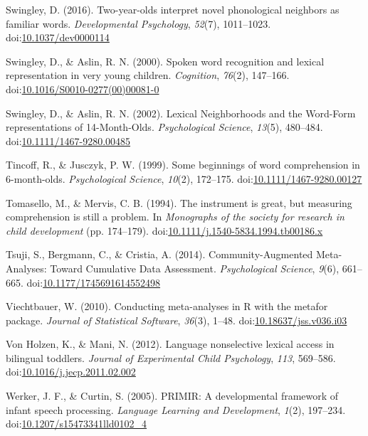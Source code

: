 \documentclass[man]{apa6}
\theoremstyle{definition}
\theoremstyle{definition}
\theoremstyle{definition}
\theoremstyle{remark}
\begin{document}
\hypertarget{ref-Swingley2016}{}
Swingley, D. (2016). Two-year-olds interpret novel phonological
neighbors as familiar words. \emph{Developmental Psychology},
\emph{52}(7), 1011--1023.
doi:\href{https://doi.org/10.1037/dev0000114}{10.1037/dev0000114}

\hypertarget{ref-Swingley2000}{}
Swingley, D., \& Aslin, R. N. (2000). Spoken word recognition and
lexical representation in very young children. \emph{Cognition},
\emph{76}(2), 147--166.
doi:\href{https://doi.org/10.1016/S0010-0277(00)00081-0}{10.1016/S0010-0277(00)00081-0}

\hypertarget{ref-Swingley2002}{}
Swingley, D., \& Aslin, R. N. (2002). Lexical Neighborhoods and the
Word-Form representations of 14-Month-Olds. \emph{Psychological
Science}, \emph{13}(5), 480--484.
doi:\href{https://doi.org/10.1111/1467-9280.00485}{10.1111/1467-9280.00485}

\hypertarget{ref-Tincoff1999}{}
Tincoff, R., \& Jusczyk, P. W. (1999). Some beginnings of word
comprehension in 6-month-olds. \emph{Psychological Science},
\emph{10}(2), 172--175.
doi:\href{https://doi.org/10.1111/1467-9280.00127}{10.1111/1467-9280.00127}

\hypertarget{ref-Tomasello1994}{}
Tomasello, M., \& Mervis, C. B. (1994). The instrument is great, but
measuring comprehension is still a problem. In \emph{Monographs of the
society for research in child development} (pp. 174--179).
doi:\href{https://doi.org/10.1111/j.1540-5834.1994.tb00186.x}{10.1111/j.1540-5834.1994.tb00186.x}

\hypertarget{ref-Tsuji2014}{}
Tsuji, S., Bergmann, C., \& Cristia, A. (2014). Community-Augmented
Meta-Analyses: Toward Cumulative Data Assessment. \emph{Psychological
Science}, \emph{9}(6), 661--665.
doi:\href{https://doi.org/10.1177/1745691614552498}{10.1177/1745691614552498}

\hypertarget{ref-metafor}{}
Viechtbauer, W. (2010). Conducting meta-analyses in R with the metafor
package. \emph{Journal of Statistical Software}, \emph{36}(3), 1--48.
doi:\href{https://doi.org/10.18637/jss.v036.i03}{10.18637/jss.v036.i03}

\hypertarget{ref-VonHolzen2012}{}
Von Holzen, K., \& Mani, N. (2012). Language nonselective lexical access
in bilingual toddlers. \emph{Journal of Experimental Child Psychology},
\emph{113}, 569--586.
doi:\href{https://doi.org/10.1016/j.jecp.2011.02.002}{10.1016/j.jecp.2011.02.002}

\hypertarget{ref-Werker2005}{}
Werker, J. F., \& Curtin, S. (2005). PRIMIR: A developmental framework
of infant speech processing. \emph{Language Learning and Development},
\emph{1}(2), 197--234.
doi:\href{https://doi.org/10.1207/s15473341lld0102_4}{10.1207/s15473341lld0102\_4}
\end{document}
